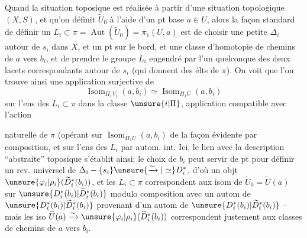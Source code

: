 Quand  la situation toposique est réalisée à partir d'une situation topologique \((X,S)\), et qu'on définit \(\widetilde U_0\) à l'aide d'un pt base \(a\in U\), alors la façon standard de définir un \(L_i\subset\pi=\operatorname{Aut}(\widetilde U_0)=\pi_1(U,a)\) est de choisir une petite  \(\Delta_i\) autour de \(s_i\) dans \(X\),
et un pt  sur le bord, et une classe d'homotopie de chemins  de \(a\) vers \(b_i\), et de prendre le groupe \(L_i\) engendré par l'un quelconque des deux lacets correspondants autour de \(s_i\) (qui donnent des  élts  de \(\pi\)).
On voit que l'on trouve ainsi une application surjective de
\[
\operatorname{Isom}_{\Pi_1V_i}(a,b_i)\simeq
\operatorname{Isom}_{\Pi_1U}(a,b_i)
\]
 sur l'ens des \(L_i\subset\pi\) dans la classe \(\unsure{i|\Pi}\), application  compatible avec l'action


naturelle de \(\pi\) (opérant sur \(\operatorname{Isom}_{\Pi_1U}(a,b_i)\) de la façon évidente par composition, et sur l'ens des \(L_i\) par autom. int.
 Ici, le  lien avec la description ``abstraite'' toposique s'établit ainsi: le choix de \(b_i\) peut servir de pt  pour définir un rev. universel de \(\Delta_i-\{s_i\}\unsure{\xrightarrow{\sim}|\simeq}D_i^*\), d'où un objt \(\unsure{\varphi_i|\rho_i}(\widetilde D_i^*(b_i))\), et  les \(L_i\subset\pi\) correspondent  aux isom de \(\widetilde U_0=\widetilde U(a)\) sur \(\unsure{D_i^*(b_i)|\widetilde D_i^*(b_i)}\) modulo composition avec un autom de \(\unsure{D_i^*(b_i)|\widetilde D_i^*(b_i)}\) provenant d'un autom de \(\unsure{D_i^*(b_i)|\widetilde D_i^*(b_i)}\) -- mais les iso  \(\widetilde U(a)\xrightarrow{\sim}\unsure{\varphi_i|\rho_i}(\widetilde D_i^*(b_i))\) correspondent justement aux classes de chemins de \(a\) vers \(b_i\).

